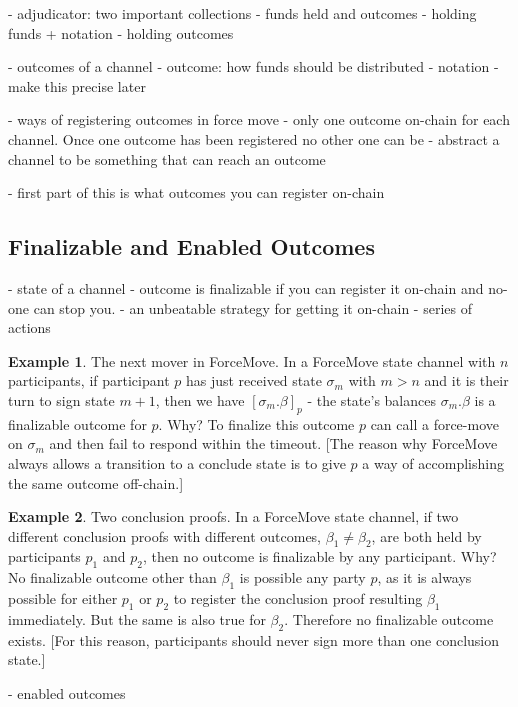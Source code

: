 \documentclass{article}
\theoremstyle{definition}
\newtheorem{example}{Example}[section]
\newcommand{\enf}[1]{[#1]}
\begin{document}
- adjudicator: two important collections - funds held and outcomes
- holding funds + notation
- holding outcomes

- outcomes of a channel
- outcome: how funds should be distributed
- notation
- make this precise later


- ways of registering outcomes in force move
- only one outcome on-chain for each channel. Once one outcome has been registered no other one can be
- abstract a channel to be something that can reach an outcome

- first part of this is what outcomes you can register on-chain

\subsection{Finalizable and Enabled Outcomes}

- state of a channel
- outcome is finalizable if you can register it on-chain and no-one can stop you.
- an unbeatable strategy for getting it on-chain
- series of actions

\begin{example}{The next mover in ForceMove.}
  In a ForceMove state channel with $n$ participants, if participant $p$ has just received state $\sigma_m$ with $m > n$ and it is their turn to sign state $m+1$, then we have $\enf{\sigma_m.\beta}_p$ - the state's balances $\sigma_m.\beta$ is a finalizable outcome for $p$.
  Why? To finalize this outcome $p$ can call a force-move on $\sigma_m$ and then fail to respond within
  the timeout. [The reason why ForceMove always allows a transition to a conclude state is to
  give $p$ a way of accomplishing the same outcome off-chain.]
\end{example}

\begin{example}{Two conclusion proofs.}
  In a ForceMove state channel, if two different conclusion proofs with different outcomes,
  $\beta_1 \neq \beta_2$, are both held by participants $p_1$ and $p_2$, then no outcome is finalizable by any participant.
  Why? No finalizable outcome other than $\beta_1$ is possible any party $p$, as it is always
  possible for either $p_1$ or $p_2$ to register the conclusion proof resulting $\beta_1$ immediately.
  But the same is also true for $\beta_2$. Therefore no finalizable outcome exists.
  [For this reason, participants should never sign more than one conclusion state.]
\end{example}

- enabled outcomes
\end{document}
